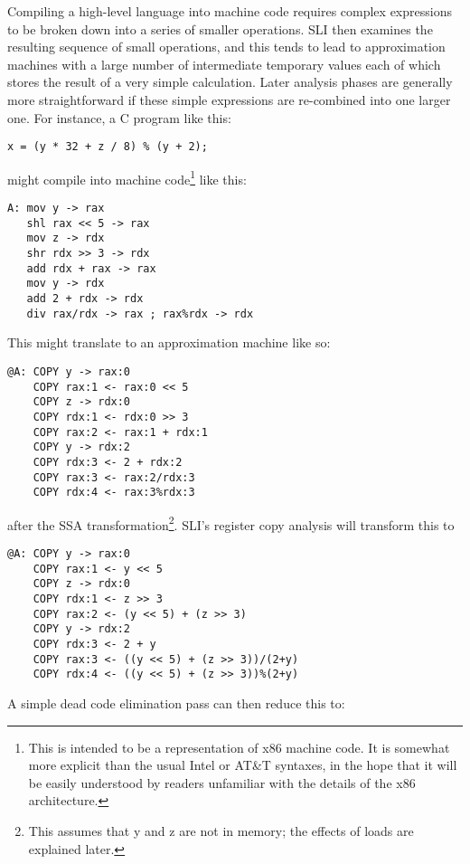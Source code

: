 \documentclass[12pt,a4paper]{book}
\begin{document}
Compiling a high-level language into machine code requires complex expressions to be broken down into a series of smaller operations.
SLI then examines the resulting sequence of small operations, and this tends to lead to approximation machines with a large number of intermediate temporary values each of which stores the result of a very simple calculation.
Later analysis phases are generally more straightforward if these simple expressions are re-combined into one larger one.
For instance, a C program like this:

\begin{verbatim}
x = (y * 32 + z / 8) % (y + 2);
\end{verbatim}

might compile into machine code\footnote{This is intended to be a representation of x86 machine code.  It is somewhat more explicit than the usual Intel or AT\&{}T syntaxes, in the hope that it will be easily understood by readers unfamiliar with the details of the x86 architecture.} like this:

\begin{verbatim}
A: mov y -> rax
   shl rax << 5 -> rax
   mov z -> rdx
   shr rdx >> 3 -> rdx
   add rdx + rax -> rax
   mov y -> rdx
   add 2 + rdx -> rdx
   div rax/rdx -> rax ; rax%rdx -> rdx
\end{verbatim}

This might translate to an approximation machine like so:

\begin{verbatim}
@A: COPY y -> rax:0
    COPY rax:1 <- rax:0 << 5
    COPY z -> rdx:0
    COPY rdx:1 <- rdx:0 >> 3
    COPY rax:2 <- rax:1 + rdx:1
    COPY y -> rdx:2
    COPY rdx:3 <- 2 + rdx:2
    COPY rax:3 <- rax:2/rdx:3
    COPY rdx:4 <- rax:3%rdx:3
\end{verbatim}

after the SSA transformation\footnote{This assumes that y and z are not in memory; the effects of loads are explained later.}.
SLI's register copy analysis will transform this to

\begin{verbatim}
@A: COPY y -> rax:0
    COPY rax:1 <- y << 5
    COPY z -> rdx:0
    COPY rdx:1 <- z >> 3
    COPY rax:2 <- (y << 5) + (z >> 3)
    COPY y -> rdx:2
    COPY rdx:3 <- 2 + y
    COPY rax:3 <- ((y << 5) + (z >> 3))/(2+y)
    COPY rdx:4 <- ((y << 5) + (z >> 3))%(2+y)
\end{verbatim}

A simple dead code elimination pass can then reduce this to:
\end{document}
